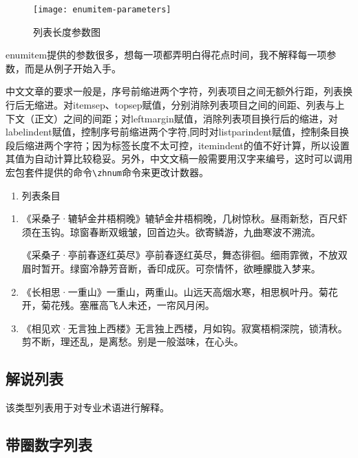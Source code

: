 \begin{figure}[!htb]
    \centering
    \texttt{[image: enumitem-parameters]}
    \caption{列表长度参数图}
\end{figure}

enumitem提供的参数很多，想每一项都弄明白得花点时间，我不解释每一项参数，而是从例子开始入手。

中文文章的要求一般是，序号前缩进两个字符，列表项目之间无额外行距，列表换行后无缩进。对itemsep、topsep赋值，分别消除列表项目之间的间距、列表与上下文（正文）之间的间距；对leftmargin赋值，消除列表项目换行后的缩进，对labelindent赋值，控制序号前缩进两个字符,同时对listparindent赋值，控制条目换段后缩进两个字符；因为标签长度不太可控，itemindent的值不好计算，所以设置其值为自动计算比较稳妥。另外，中文文稿一般需要用汉字来编号，这时可以调用\CTeX{}宏包套件提供的命令\lstinline|\zhnum|命令来更改计数器。

\begin{latex}
\begin{enumerate}[label=(\zhnum*),itemsep=0pt,parsep=0pt,topsep=0pt,leftmargin=0pt,labelindent=\parindent,listparindent=\parindent,itemindent=*]
\item 列表条目
\end{enumerate}
\end{latex}

\begin{enumerate}[label=(\zhnum*),itemsep=0pt,parsep=0pt,topsep=0pt,leftmargin=0pt,labelindent=\parindent,listparindent=\parindent,itemindent=*]
\item 《采桑子·辘轳金井梧桐晚》辘轳金井梧桐晚，几树惊秋。昼雨新愁，百尺虾须在玉钩。琼窗春断双蛾皱，回首边头。欲寄鳞游，九曲寒波不溯流。\par
《采桑子·亭前春逐红英尽》亭前春逐红英尽，舞态徘徊。细雨霏微，不放双眉时暂开。绿窗冷静芳音断，香印成灰。可奈情怀，欲睡朦胧入梦来。
\item 《长相思·一重山》一重山，两重山。山远天高烟水寒，相思枫叶丹。菊花开，菊花残。塞雁高飞人未还，一帘风月闲。 
\item 《相见欢·无言独上西楼》无言独上西楼，月如钩。寂寞梧桐深院，锁清秋。剪不断，理还乱，是离愁。别是一般滋味，在心头。
\end{enumerate}

\subsection{解说列表}
该类型列表用于对专业术语进行解释。

\subsection{带圈数字列表}

